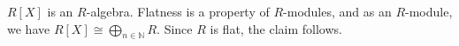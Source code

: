 $R[X]$ is an $R$-algebra. Flatness is a property of $R$-modules, and as an $R$-module,
we have $R[X] \cong \bigoplus_{n \in \mathbb{N}} R$. Since $R$ is flat, the claim
follows.
